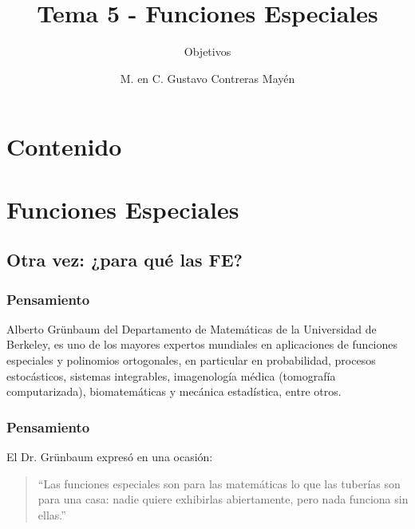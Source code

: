 
\title{\large{Tema 5 - Funciones Especiales}}
\subtitle{Objetivos}
\author{M. en C. Gustavo Contreras Mayén}
\date{}

\maketitle
\fontsize{14}{14}\selectfont
{}
\section*{Contenido}
\section{Funciones Especiales}
\subsection{Otra vez: ¿para qué las FE?}
\begin{frame}
\frametitle{Pensamiento}
Alberto Grünbaum del Departamento de Matemáticas de la Universidad de Berkeley, es uno de los mayores expertos mundiales en aplicaciones de funciones especiales y polinomios ortogonales, en particular en probabilidad, procesos estocásticos, sistemas integrables, imagenología médica (tomografía computarizada), biomatemáticas y mecánica estadística, entre otros.
\end{frame}
\begin{frame}
\frametitle{Pensamiento}
El Dr. Grünbaum expresó en una ocasión:
\\
\bigskip
\pause
\begin{quote}
\enquote{Las funciones especiales son para las matemáticas lo que las tuberías son para una casa: nadie quiere exhibirlas abiertamente, pero nada funciona sin ellas.}
\end{quote}
\end{frame}
